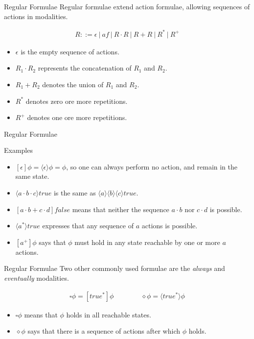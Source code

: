 \documentclass[aspectratio=1610]{beamer}
\begin{document}
  \begin{frame}{Regular Formulae}
    Regular formulae extend action formulae, allowing sequences of actions in modalities.

    \begin{align*}
      R ::= \epsilon\ |\ af\ |\ R\cdot{R}\ |\ R+R\ |\ R^*\ |\ R^+
    \end{align*}

    \begin{itemize}
      \item $\epsilon$ is the empty sequence of actions.
      \item $R_1\cdot{R_2}$ represents the concatenation of $R_1$ and $R_2$.
      \item $R_1+R_2$ denotes the union of  $R_1$ and $R_2$.
      \item $R^*$ denotes zero ore more repetitions.
      \item $R^+$ denotes one ore more repetitions.
    \end{itemize}
  \end{frame}

  \begin{frame}{Regular Formulae}
    \begin{exampleblock}{Examples}
      \begin{itemize}
        \item $[\epsilon]\phi = \langle\epsilon\rangle\phi = \phi$, so one can always perform no action, and remain in the same state.
        \item $\langle{a}\cdot{b}\cdot{c}\rangle{true}$ is the same as $\langle{a}\rangle\langle{b}\rangle\langle{c}\rangle{true}$.
        \item $[a\cdot{b} + c\cdot{d}]false$ means that neither the sequence $a\cdot{b}$ nor $c\cdot{d}$ is possible.
        \item $\langle{a^*}\rangle{true}$ expresses that any sequence of $a$ actions is possible.
        \item $[a^+]\phi$ says that $\phi$ must hold in any state reachable by one or more $a$ actions.
      \end{itemize}
    \end{exampleblock}
  \end{frame}

  \begin{frame}{Regular Formulae}
    Two other commonly used formulae are the \textit{always} and \textit{eventually} modalities.

    \begin{align*}
      \square\phi = [true^*]\phi \qquad\qquad    \diamond\phi = \langle{true^*}\rangle\phi
    \end{align*}

    \begin{itemize}
      \item $\square\phi$ means that $\phi$ holds in all reachable states.
      \item $\diamond\phi$ says that there is a sequence of actions after which $\phi$ holds.
    \end{itemize}
  \end{frame}
\end{document}
